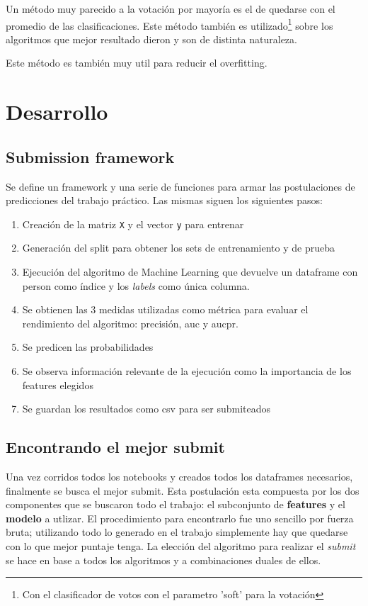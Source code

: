 \documentclass[a4paper]{article}
\begin{document}
Un método muy parecido a la votación por mayoría es el de quedarse con el promedio de las clasificaciones. Este método también es utilizado\footnote{Con el clasificador de votos con el parametro 'soft' para la votación} sobre los algoritmos que mejor resultado dieron y son de distinta naturaleza. 

Este método es también muy util para reducir el overfitting.

\section{Desarrollo}

\subsection{Submission framework}

Se define un framework y una serie de funciones para armar las postulaciones de predicciones del trabajo práctico. Las mismas siguen los siguientes pasos:

\begin{enumerate}
	\item Creación de la matriz \texttt{X} y el vector \texttt{y} para entrenar
	\item Generación del split para obtener los sets de entrenamiento y de prueba
	\item Ejecución del algoritmo de Machine Learning que devuelve un dataframe con person como índice y los \textit{labels} como única columna.
	\item Se obtienen las 3 medidas utilizadas como métrica para evaluar el rendimiento del algoritmo: precisión, auc y aucpr.
	\item Se predicen las probabilidades 
	\item Se observa información relevante de la ejecución como la importancia de los features elegidos
	\item Se guardan los resultados como csv para ser submiteados
\end{enumerate}

\subsection{Encontrando el mejor submit}

Una vez corridos todos los notebooks y creados todos los dataframes necesarios, finalmente se busca el mejor submit. Esta postulación esta compuesta por los dos componentes que se buscaron todo el trabajo: el subconjunto de \textbf{features} y el \textbf{modelo} a utlizar. El procedimiento para encontrarlo fue uno sencillo por fuerza bruta; utilizando todo lo generado en el trabajo simplemente hay que quedarse con lo que mejor puntaje tenga. La elección del algoritmo para realizar el \textit{submit} se hace en base a todos los algoritmos y a combinaciones duales de ellos.
\end{document}
